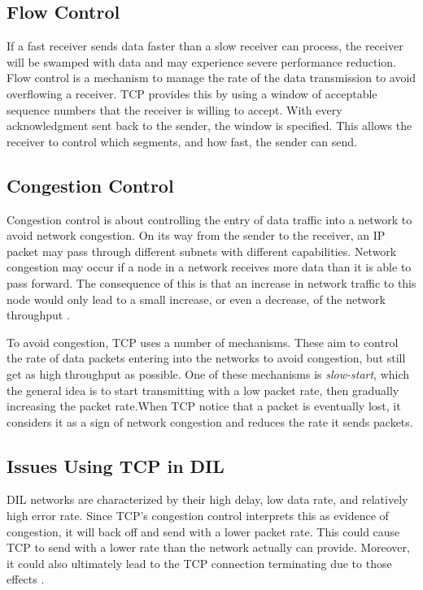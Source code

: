 \subsection{Flow Control}

If a fast receiver sends data faster than a slow receiver can process, the
receiver will be swamped with data and may experience severe performance
reduction. Flow control is a mechanism to manage the rate of the data
transmission to avoid overflowing a receiver. TCP provides this by using a
window of acceptable sequence numbers that the receiver is willing to accept.
With every acknowledgment sent back to the sender, the window is specified.
This allows the receiver to control which segments, and how fast, the sender can
send.

\subsection{Congestion Control}

Congestion control is about controlling the entry of data traffic into a network
to avoid network congestion. On its way from the sender to the receiver, an IP
packet may pass through different subnets with different capabilities. Network
congestion may occur if a node in a network receives more data than it is able
to pass forward. The consequence of this is that an increase in network traffic
to this node would only lead to a small increase, or even a decrease, of the
network throughput \cite{Al-Bahadili2012}.

To avoid congestion, TCP uses a number of mechanisms. These aim to control the
rate of data packets entering into the networks to avoid congestion, but still
get as high throughput as possible. One of these mechanisms is
\textit{slow-start}, which the general idea is to start transmitting with a low
packet rate, then gradually increasing the packet rate.When TCP notice that a
packet is eventually lost, it considers it as a sign of network congestion and
reduces the rate it sends packets.

\subsection{Issues Using TCP in DIL}
\label{section:tcp-problems}

DIL networks are characterized by their high delay, low data rate, and relatively
high error rate. Since TCP's congestion control interprets this as evidence of
congestion, it will back off and send with a lower packet rate. This could cause
TCP to send with a lower rate than the network actually can provide. Moreover,
it could also ultimately lead to the TCP connection terminating due to those
effects \cite{nato-disadvantaged-grids}.


